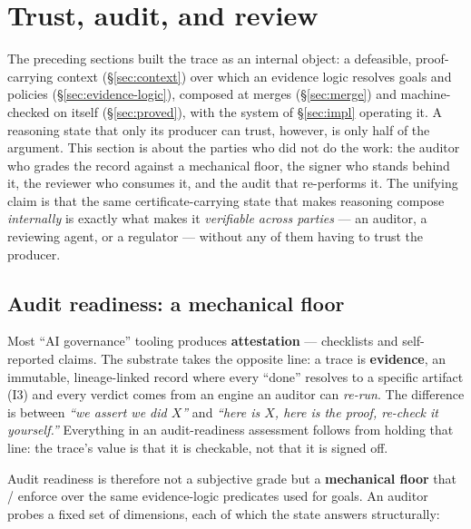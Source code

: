 \section{Trust, audit, and review}\label{sec:trust}

The preceding sections built the trace as an internal object: a defeasible, proof-carrying context
(\S\ref{sec:context}) over which an evidence logic resolves goals and policies
(\S\ref{sec:evidence-logic}), composed at merges (\S\ref{sec:merge}) and machine-checked on itself
(\S\ref{sec:proved}), with the system of \S\ref{sec:impl} operating it. A reasoning state that only its
producer can trust, however, is only half of the argument. This section is about the parties who did not do
the work: the auditor who grades the record against a mechanical floor, the signer who stands behind it,
the reviewer who consumes it, and the audit that re-performs it. The unifying claim is that the same
certificate-carrying state that makes reasoning compose \emph{internally} is exactly what makes it
\emph{verifiable across parties} --- an auditor, a reviewing agent, or a regulator --- without any of them
having to trust the producer.

\subsection{Audit readiness: a mechanical floor}\label{sec:interchange-audit}

Most ``AI governance'' tooling produces \textbf{attestation} --- checklists and self-reported claims. The
substrate takes the opposite line: a trace is \textbf{evidence}, an immutable, lineage-linked record where
every ``done'' resolves to a specific artifact (I3) and every verdict comes from an engine an auditor can
\emph{re-run}. The difference is between \emph{``we assert we did $X$''} and \emph{``here is $X$, here is the
proof, re-check it yourself.''} Everything in an audit-readiness assessment follows from holding that line:
the trace's value is that it is checkable, not that it is signed off.

Audit readiness is therefore not a subjective grade but a \textbf{mechanical floor} that  /
 enforce over the same evidence-logic predicates used for goals. An auditor probes a
fixed set of dimensions, each of which the state answers structurally:

